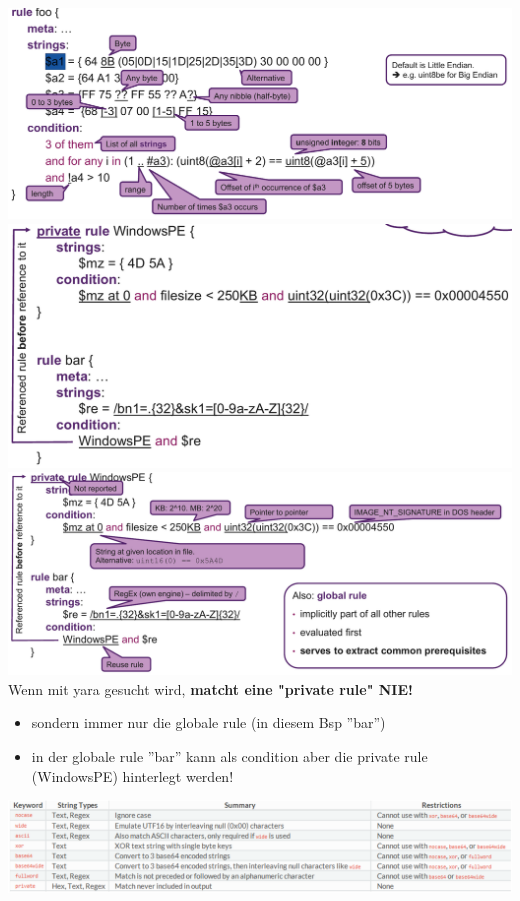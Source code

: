 \includegraphics[width=\linewidth]{./img/13-yara/yara_rule_explained2.png}
\includegraphics[width=\linewidth]{./img/13-yara/yara_rule3.png}
\includegraphics[width=\linewidth]{./img/13-yara/yara_rule_explained3.png}
Wenn mit yara gesucht wird, \textbf{matcht eine "private rule" NIE!}
\begin{itemize}
    \item sondern immer nur die globale rule (in diesem Bsp ''bar'')
    \item in der globale rule ''bar'' kann als condition aber die private rule (WindowsPE) hinterlegt werden!\\
\end{itemize}
\includegraphics[width=\linewidth]{./img/13-yara/yara_string.png}

